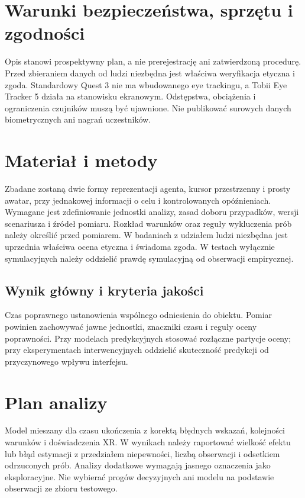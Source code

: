 \documentclass[11pt,a4paper]{article}
\begin{document}
\section{Warunki bezpieczeństwa, sprzętu i zgodności}
Opis stanowi prospektywny plan, a nie prerejestrację ani zatwierdzoną procedurę. Przed zbieraniem danych od ludzi niezbędna jest właściwa weryfikacja etyczna i zgoda. Standardowy Quest 3 nie ma wbudowanego eye trackingu, a Tobii Eye Tracker 5 działa na stanowisku ekranowym. Odstępstwa, obciążenia i ograniczenia czujników muszą być ujawnione. Nie publikować surowych danych biometrycznych ani nagrań uczestników.

\section{Materiał i metody}

Zbadane zostaną dwie formy reprezentacji agenta, kursor przestrzenny i prosty awatar, przy jednakowej informacji o celu i kontrolowanych opóźnieniach. Wymagane jest zdefiniowanie jednostki analizy, zasad doboru przypadków, wersji scenariusza i źródeł pomiaru. Rozkład warunków oraz reguły wykluczenia prób należy określić przed pomiarem. W badaniach z udziałem ludzi niezbędna jest uprzednia właściwa ocena etyczna i świadoma zgoda. W testach wyłącznie symulacyjnych należy oddzielić prawdę symulacyjną od obserwacji empirycznej.

\subsection{Wynik główny i kryteria jakości}

Czas poprawnego ustanowienia wspólnego odniesienia do obiektu. Pomiar powinien zachowywać jawne jednostki, znaczniki czasu i reguły oceny poprawności. Przy modelach predykcyjnych stosować rozłączne partycje oceny; przy eksperymentach interwencyjnych oddzielić skuteczność predykcji od przyczynowego wpływu interfejsu.

\section{Plan analizy}

Model mieszany dla czasu ukończenia z korektą błędnych wskazań, kolejności warunków i doświadczenia XR. W wynikach należy raportować wielkość efektu lub błąd estymacji z przedziałem niepewności, liczbą obserwacji i odsetkiem odrzuconych prób. Analizy dodatkowe wymagają jasnego oznaczenia jako eksploracyjne. Nie wybierać progów decyzyjnych ani modelu na podstawie obserwacji ze zbioru testowego.
\end{document}
